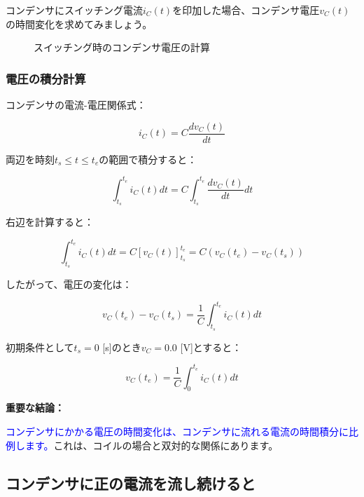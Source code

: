 コンデンサにスイッチング電流$i_C(t)$を印加した場合、コンデンサ電圧$v_C(t)$の時間変化を求めてみましょう。

\begin{figure}[H]
\centering
{}
\caption{スイッチング時のコンデンサ電圧の計算}
\label{fig:ch04_capacitor_voltage}
\end{figure}

\subsubsection{電圧の積分計算}

コンデンサの電流-電圧関係式：

\begin{equation}
i_C(t) = C \frac{dv_C(t)}{dt}
\end{equation}

両辺を時刻$t_s \leq t \leq t_e$の範囲で積分すると：

\begin{equation}
\int_{t_s}^{t_e} i_C(t)dt = C \int_{t_s}^{t_e} \frac{dv_C(t)}{dt} dt
\end{equation}

右辺を計算すると：

\begin{equation}
\int_{t_s}^{t_e} i_C(t)dt = C \left[ v_C(t) \right]_{t_s}^{t_e} = C(v_C(t_e) - v_C(t_s))
\end{equation}

したがって、電圧の変化は：

\begin{equation}
v_C(t_e) - v_C(t_s) = \frac{1}{C} \int_{t_s}^{t_e} i_C(t)dt
\end{equation}

初期条件として$t_s = 0$ [s]のとき$v_C = 0.0$ [V]とすると：

\begin{equation}
v_C(t_e) = \frac{1}{C} \int_0^{t_e} i_C(t)dt
\end{equation}

\textbf{重要な結論：}

\textcolor{blue}{コンデンサにかかる電圧の時間変化は、コンデンサに流れる電流の時間積分に比例します。}これは、コイルの場合と双対的な関係にあります。

\subsection{コンデンサに正の電流を流し続けると}

